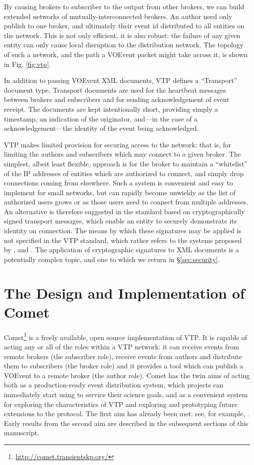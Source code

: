 \documentclass[5p,authoryear]{elsarticle}
\begin{document}
By causing brokers to subscriber to the output from other brokers, we can
build extended networks of mutually-interconnected brokers. An author need
only publish to one broker, and ultimately their event id distributed to all
entities on the network. This is not only efficient, it is also robust: the
failure of any given entity can only cause local disruption to the
distribution network. The topology of such a network, and the path a VOEvent
packet might take across it, is shown in Fig. \ref{fig:vtp}.

In addition to passing VOEvent XML documents, VTP defines a ``Transport''
document type. Transport documents are used for the heartbeat messages between
brokers and subscribers and for sending acknowledgement of event receipt. The
documents are kept intentionally short, providing simply a timestamp, an
indication of the originator, and---in the case of a acknowledgement---the
identity of the event being acknowledged.

VTP makes limited provision for securing access to the network: that is, for
limiting the authors and subscribers which may connect to a given broker. The
simplest, albeit least flexible, approach is for the broker to maintain a
``whitelist'' of the IP addresses of entities which are authorized to connect,
and simply drop connections coming from elsewhere. Such a system is convenient
and easy to implement for small networks, but can rapidly become unwieldy as
the list of authorized users grows or as those users need to connect from
multiple addresses. An alternative is therefore suggested in the standard
based on cryptographically signed transport messages, which enable an entity
to securely demonstrate its identity on connection. The means by which these
signatures may be applied is not specified in the VTP standard, which rather
refers to the systems proposed by \citet{Denny:2008}, \citet{Allen:2008} and
\citet{Rixon:2005}. The application of cryptographic signatures to XML
documents is a potentially complex topic, and one to which we return in
\S\ref{sec:security}.

\section{The Design and Implementation of Comet}
\label{sec:design}

Comet\footnote{\url{http://comet.transientskp.org/}} is a freely available,
open source implementation of VTP. It is capable of acting any or all of the
roles within a VTP network: it can receive events from remote brokers (the
subscriber role), receive events from authors and distribute them to
subscribers (the broker role) and it provides a tool which can publish a
VOEvent to a remote broker (the author role). Comet has the twin aims of
acting both as a production-ready event distribution system, which projects
can immediately start using to service their science goals, and as a
convenient system for exploring the characteristics of VTP and exploring and
prototyping future extensions to the protocol. The first aim has already been
met: see, for example, \citet{Staley:2013}. Early results from the second aim
are described in the subsequent sections of this manuscript.
\end{document}
